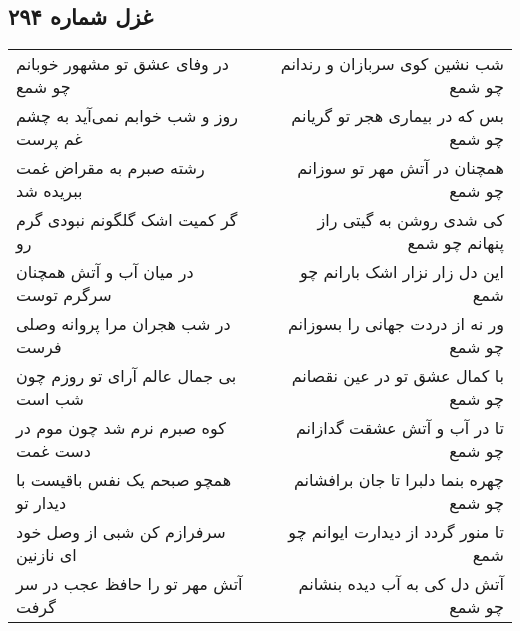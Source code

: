 \begin{center}
\section*{غزل شماره ۲۹۴}
\label{sec:sh294}
\begin{longtable}{l p{0.5cm} r}
در وفای عشق تو مشهور خوبانم چو شمع
&&
شب نشین کوی سربازان و رندانم چو شمع
\\
روز و شب خوابم نمی‌آید به چشم غم پرست
&&
بس که در بیماری هجر تو گریانم چو شمع
\\
رشته صبرم به مقراض غمت ببریده شد
&&
همچنان در آتش مهر تو سوزانم چو شمع
\\
گر کمیت اشک گلگونم نبودی گرم رو
&&
کی شدی روشن به گیتی راز پنهانم چو شمع
\\
در میان آب و آتش همچنان سرگرم توست
&&
این دل زار نزار اشک بارانم چو شمع
\\
در شب هجران مرا پروانه وصلی فرست
&&
ور نه از دردت جهانی را بسوزانم چو شمع
\\
بی جمال عالم آرای تو روزم چون شب است
&&
با کمال عشق تو در عین نقصانم چو شمع
\\
کوه صبرم نرم شد چون موم در دست غمت
&&
تا در آب و آتش عشقت گدازانم چو شمع
\\
همچو صبحم یک نفس باقیست با دیدار تو
&&
چهره بنما دلبرا تا جان برافشانم چو شمع
\\
سرفرازم کن شبی از وصل خود ای نازنین
&&
تا منور گردد از دیدارت ایوانم چو شمع
\\
آتش مهر تو را حافظ عجب در سر گرفت
&&
آتش دل کی به آب دیده بنشانم چو شمع
\\
\end{longtable}
\end{center}
